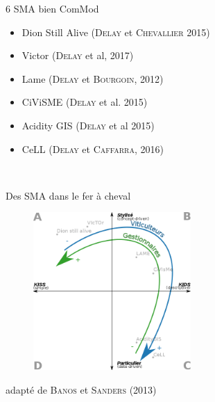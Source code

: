 \documentclass[newPxFont]{beamer}
\begin{document}
\begin{frame}[c]{6 SMA bien ComMod}
  \vspace{-2em}
  \begin{itemize}
    \item Dion Still Alive {\color{lightgray}(\textsc{Delay} et \textsc{Chevallier} 2015)}
    \item Victor {\color{lightgray}(\textsc{Delay} et al, 2017)}
    \item Lame {\color{lightgray}(\textsc{Delay} et \textsc{Bourgoin}, 2012)}
    \item CiViSME {\color{lightgray}(\textsc{Delay} et al. 2015)}
    \item Acidity GIS {\color{lightgray}(\textsc{Delay} et al 2015)}
    \item CeLL {\color{lightgray}(\textsc{Delay} et \textsc{Caffarra}, 2016)}
  \end{itemize}
  \vspace{-2em}
  \begin{figure}
    \\ %
  \end{figure}
\end{frame}

\begin{frame}[c]{Des SMA dans le fer à cheval}
  \vspace{-2em}
  \begin{figure}
   \includegraphics[height=6cm]{img/a_banos_sanders_positionnements.png}
  \end{figure}
  \hspace*{\fill}adapté de \textsc{Banos} et \textsc{Sanders} (2013)
\end{frame}
\end{document}
